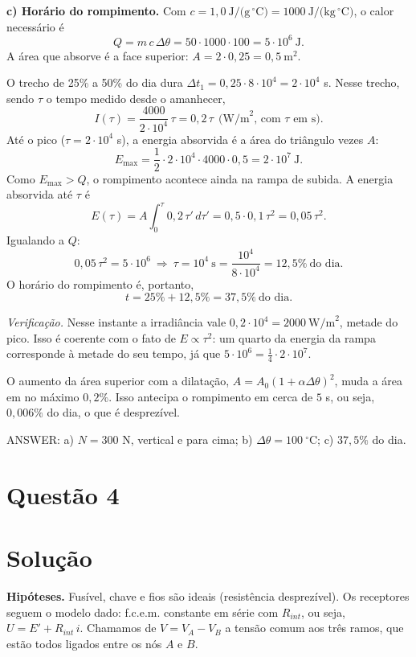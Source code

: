 \documentclass{article}%
\begin{document}
\medskip
\textbf{c) Horário do rompimento.} Com $c = 1{,}0\ \text{J/(g}\,^\circ\text{C)} = 1000\ \text{J/(kg}\,^\circ\text{C)}$, o calor necessário é
\[
Q = m\,c\,\Delta\theta = 50\cdot 1000\cdot 100 = 5\cdot 10^{6}\ \text{J}.
\]
A área que absorve é a face superior: $A = 2\cdot 0{,}25 = 0{,}5\ \text{m}^2$.

O trecho de 25\% a 50\% do dia dura $\Delta t_1 = 0{,}25\cdot 8\cdot 10^4 = 2\cdot 10^4$ s. Nesse trecho, sendo $\tau$ o tempo medido desde o amanhecer,
\[
I(\tau) = \frac{4000}{2\cdot 10^4}\,\tau = 0{,}2\,\tau\ \ \text{(W/m}^2\text{, com } \tau \text{ em s)}.
\]
Até o pico ($\tau = 2\cdot 10^4$ s), a energia absorvida é a área do triângulo vezes $A$:
\[
E_{\max} = \frac{1}{2}\cdot 2\cdot 10^4\cdot 4000\cdot 0{,}5 = 2\cdot 10^7\ \text{J}.
\]
Como $E_{\max} > Q$, o rompimento acontece ainda na rampa de subida. A energia absorvida até $\tau$ é
\[
E(\tau) = A\int_0^{\tau} 0{,}2\,\tau'\,d\tau' = 0{,}5\cdot 0{,}1\,\tau^2 = 0{,}05\,\tau^2 .
\]
Igualando a $Q$:
\[
0{,}05\,\tau^2 = 5\cdot 10^6\ \Rightarrow\ \tau = 10^4\ \text{s} = \frac{10^4}{8\cdot 10^4} = 12{,}5\%\ \text{do dia}.
\]
O horário do rompimento é, portanto,
\[
t = 25\% + 12{,}5\% = 37{,}5\%\ \text{do dia}.
\]

\textit{Verificação.} Nesse instante a irradiância vale $0{,}2\cdot 10^4 = 2000\ \text{W/m}^2$, metade do pico. Isso é coerente com o fato de $E \propto \tau^2$: um quarto da energia da rampa corresponde à metade do seu tempo, já que $5\cdot 10^6 = \frac{1}{4}\cdot 2\cdot 10^7$.

O aumento da área superior com a dilatação, $A = A_0(1+\alpha\Delta\theta)^2$, muda a área em no máximo $0{,}2\%$. Isso antecipa o rompimento em cerca de $5$ s, ou seja, $0{,}006\%$ do dia, o que é desprezível.

\medskip
ANSWER: a) $N = 300$ N, vertical e para cima; b) $\Delta\theta = 100\ ^\circ$C; c) $37{,}5\%$ do dia.%
\newpage%
\section*{Questão 4}

\section*{Solução}

\textbf{Hipóteses.} Fusível, chave e fios são ideais (resistência desprezível). Os receptores seguem o modelo dado: f.c.e.m. constante em série com $R_{int}$, ou seja, $U = E' + R_{int}\,i$. Chamamos de $V = V_A - V_B$ a tensão comum aos três ramos, que estão todos ligados entre os nós $A$ e $B$.
\end{document}

